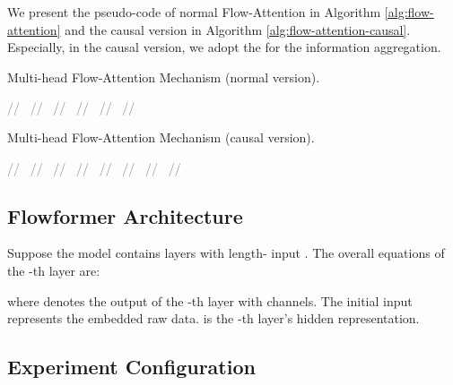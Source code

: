 \documentclass[nohyperref]{article}
\theoremstyle{plain}
\theoremstyle{definition}
\theoremstyle{remark}
\begin{document}
We present the pseudo-code of normal Flow-Attention in Algorithm \ref{alg:flow-attention} and the causal version in Algorithm \ref{alg:flow-attention-causal}. Especially, in the causal version, we adopt the  \cite{Katharopoulos2020TransformersAR} for the information aggregation.
\begin{algorithm}[hbp]
  \caption{Multi-head Flow-Attention Mechanism (normal version). }
  \label{alg:flow-attention}  
\begin{algorithmic}[1]
    
    \STATE{ } \qquad \textcolor{gray}{//\ }
    \STATE{} 
    \STATE{} \qquad \qquad \textcolor{gray}{//\ }
    \STATE{} \qquad \qquad \textcolor{gray}{//\ }
    \STATE{} \qquad \qquad \textcolor{gray}{//\ }
    \STATE{}  \qquad \qquad \textcolor{gray}{//\ }
    \STATE {} \qquad \textcolor{gray}{//\ }
\end{algorithmic}  
\end{algorithm}


\begin{algorithm}[hbp]
  \caption{Multi-head Flow-Attention Mechanism (causal version). }
  \label{alg:flow-attention-causal}  
\begin{algorithmic}[1]
   
    \STATE{}\qquad \textcolor{gray}{//\ }
    \STATE{ }\qquad \textcolor{gray}{//\ }
    \STATE{}
    \STATE{} \qquad \qquad \textcolor{gray}{//\ }
    \STATE{} \qquad \qquad \textcolor{gray}{//\ }
    \STATE{} \qquad \qquad \textcolor{gray}{//\ }
    \STATE{} \qquad \qquad \textcolor{gray}{//\ }
    \STATE{} \qquad \qquad \textcolor{gray}{//\ }
    \STATE {} \qquad \textcolor{gray}{//\ }
\end{algorithmic}
\end{algorithm}

\subsection{Flowformer Architecture}

Suppose the model contains  layers with length- input . The overall equations of the -th layer are:

where  denotes the output of the -th layer with  channels. The initial input  represents the embedded raw data.  is the -th layer's hidden representation.


\subsection{Experiment Configuration} \label{appendix:exp_details}
\end{document}
